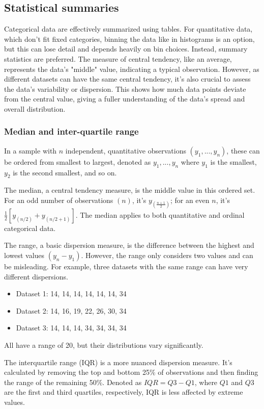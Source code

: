 \documentclass{article}
\begin{document}
\subsection{Statistical summaries}

Categorical data are effectively summarized using tables. For quantitative data, which don't fit fixed categories, binning the data like in histograms is an option, but this can lose detail and depends heavily on bin choices. Instead, summary statistics are preferred. The measure of central tendency, like an average, represents the data's "middle" value, indicating a typical observation. However, as different datasets can have the same central tendency, it's also crucial to assess the data's variability or dispersion. This shows how much data points deviate from the central value, giving a fuller understanding of the data's spread and overall distribution.

\subsubsection{Median and inter-quartile range}

In a sample with $n$ independent, quantitative observations $(y_1,...,y_n)$, these can be ordered from smallest to largest, denoted as $y_1,...,y_n$ where $y_1$ is the smallest, $y_2$ is the second smallest, and so on.

The median, a central tendency measure, is the middle value in this ordered set. For an odd number of observations $(n)$, it's $y_{(\frac{n+1}{2})}$; for an even $n$, it's $\frac{1}{2}[y_{(n/2)}+y_{(n/2+1)}]$. The median applies to both quantitative and ordinal categorical data.

The range, a basic dispersion measure, is the difference between the highest and lowest values $(y_n-y_1)$. However, the range only considers two values and can be misleading. For example, three datasets with the same range can have very different dispersions.

\begin{itemize}
    \item Dataset 1: 14, 14, 14, 14, 14, 14, 34
    \item Dataset 2: 14, 16, 19, 22, 26, 30, 34
    \item Dataset 3: 14, 14, 14, 34, 34, 34, 34
\end{itemize}
All have a range of 20, but their distributions vary significantly.

The interquartile range (IQR) is a more nuanced dispersion measure. It's calculated by removing the top and bottom 25\% of observations and then finding the range of the remaining 50\%. Denoted as $IQR=Q3-Q1$, where $Q1$ and $Q3$ are the first and third quartiles, respectively, IQR is less affected by extreme values.
\end{document}
